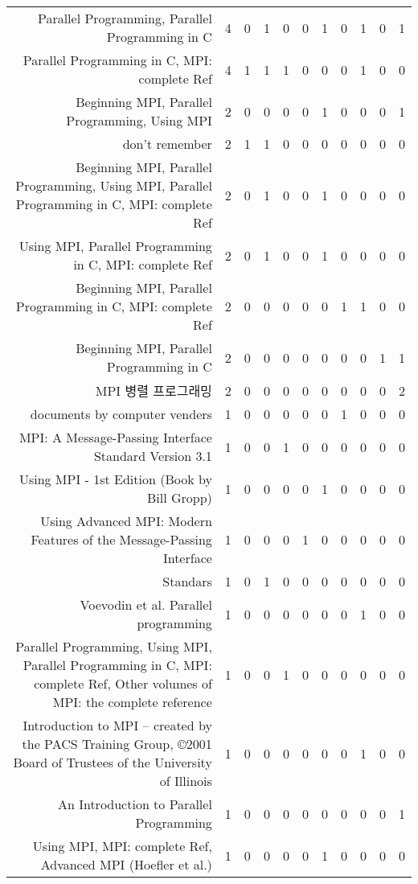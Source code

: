 {\begin{landscape}
\begin{longtable}[htb]{r|c|c|c|c|c|c|c|c|c|c}
{Parallel Programming, Parallel Programming in C} & 4 & 0 & 1 & 0 & 0 & 1 & 0 & 1 & 0 & 1 \\%
{Parallel Programming in C, MPI: complete Ref} & 4 & 1 & 1 & 1 & 0 & 0 & 0 & 1 & 0 & 0 \\%
{Beginning MPI, Parallel Programming, Using MPI} & 2 & 0 & 0 & 0 & 0 & 1 & 0 & 0 & 0 & 1 \\%
{don't remember} & 2 & 1 & 1 & 0 & 0 & 0 & 0 & 0 & 0 & 0 \\%
{Beginning MPI, Parallel Programming, Using MPI, Parallel Programming in C, MPI: complete Ref} & 2 & 0 & 1 & 0 & 0 & 1 & 0 & 0 & 0 & 0 \\%
{Using MPI, Parallel Programming in C, MPI: complete Ref} & 2 & 0 & 1 & 0 & 0 & 1 & 0 & 0 & 0 & 0 \\%
{Beginning MPI, Parallel Programming in C, MPI: complete Ref} & 2 & 0 & 0 & 0 & 0 & 0 & 1 & 1 & 0 & 0 \\%
{Beginning MPI, Parallel Programming in C} & 2 & 0 & 0 & 0 & 0 & 0 & 0 & 0 & 1 & 1 \\%
{MPI 병렬 프로그래밍} & 2 & 0 & 0 & 0 & 0 & 0 & 0 & 0 & 0 & 2 \\%
{documents by computer venders} & 1 & 0 & 0 & 0 & 0 & 0 & 1 & 0 & 0 & 0 \\%
{MPI: A Message-Passing Interface Standard Version 3.1} & 1 & 0 & 0 & 1 & 0 & 0 & 0 & 0 & 0 & 0 \\%
{Using MPI - 1st Edition (Book by Bill Gropp)} & 1 & 0 & 0 & 0 & 0 & 1 & 0 & 0 & 0 & 0 \\%
{Using Advanced MPI: Modern Features of the Message-Passing Interface} & 1 & 0 & 0 & 0 & 1 & 0 & 0 & 0 & 0 & 0 \\%
{Standars} & 1 & 0 & 1 & 0 & 0 & 0 & 0 & 0 & 0 & 0 \\%
{Voevodin et al. Parallel programming} & 1 & 0 & 0 & 0 & 0 & 0 & 0 & 1 & 0 & 0 \\%
{Parallel Programming, Using MPI, Parallel Programming in C, MPI: complete Ref, Other volumes of MPI: the complete reference} & 1 & 0 & 0 & 1 & 0 & 0 & 0 & 0 & 0 & 0 \\%
{Introduction to MPI – created by the PACS Training Group, ©2001 Board of Trustees of the University of Illinois} & 1 & 0 & 0 & 0 & 0 & 0 & 0 & 1 & 0 & 0 \\%
{An Introduction to Parallel Programming} & 1 & 0 & 0 & 0 & 0 & 0 & 0 & 0 & 0 & 1 \\%
{Using MPI, MPI: complete Ref, Advanced MPI (Hoefler et al.)} & 1 & 0 & 0 & 0 & 0 & 1 & 0 & 0 & 0 & 0 \\%

\end{longtable}
\end{landscape}}

